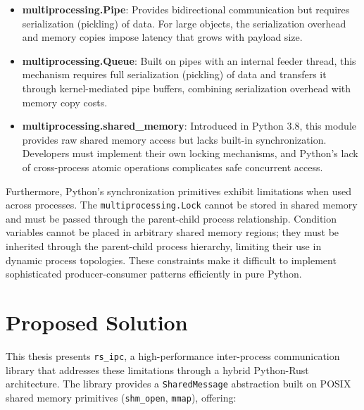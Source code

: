 \begin{itemize}
    \item \textbf{multiprocessing.Pipe}: Provides bidirectional communication but requires serialization (pickling) of data. For large objects, the serialization overhead and memory copies impose latency that grows with payload size.

    \item \textbf{multiprocessing.Queue}: Built on pipes with an internal feeder thread, this mechanism requires full serialization (pickling) of data and transfers it through kernel-mediated pipe buffers, combining serialization overhead with memory copy costs.

    \item \textbf{multiprocessing.shared\_memory}: Introduced in Python 3.8, this module provides raw shared memory access but lacks built-in synchronization. Developers must implement their own locking mechanisms, and Python's lack of cross-process atomic operations complicates safe concurrent access.
\end{itemize}

Furthermore, Python's synchronization primitives exhibit limitations when used across processes. The \texttt{multiprocessing.Lock} cannot be stored in shared memory and must be passed through the parent-child process relationship. Condition variables cannot be placed in arbitrary shared memory regions; they must be inherited through the parent-child process hierarchy, limiting their use in dynamic process topologies. These constraints make it difficult to implement sophisticated producer-consumer patterns efficiently in pure Python.

\section{Proposed Solution}

This thesis presents \texttt{rs\_ipc}, a high-performance inter-process communication library that addresses these limitations through a hybrid Python-Rust architecture. The library provides a \texttt{SharedMessage} abstraction built on POSIX shared memory primitives (\texttt{shm\_open}, \texttt{mmap}), offering:

